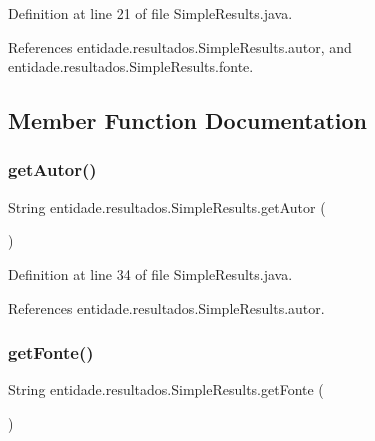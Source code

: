 Definition at line 21 of file Simple\+Results.\+java.



References entidade.\+resultados.\+Simple\+Results.\+autor, and entidade.\+resultados.\+Simple\+Results.\+fonte.



\subsection{Member Function Documentation}
\hypertarget{classentidade_1_1resultados_1_1SimpleResults_a9d78a2cab567ec7193d5a0defdd8629c}{}\label{classentidade_1_1resultados_1_1SimpleResults_a9d78a2cab567ec7193d5a0defdd8629c} 
\subsubsection{\texorpdfstring{get\+Autor()}{getAutor()}}
{\footnotesize\ttfamily String entidade.\+resultados.\+Simple\+Results.\+get\+Autor (\begin{DoxyParamCaption}{ }\end{DoxyParamCaption})}



Definition at line 34 of file Simple\+Results.\+java.



References entidade.\+resultados.\+Simple\+Results.\+autor.

\hypertarget{classentidade_1_1resultados_1_1SimpleResults_af74e679c1d8154f9c4fc247edda6abed}{}\label{classentidade_1_1resultados_1_1SimpleResults_af74e679c1d8154f9c4fc247edda6abed} 
\subsubsection{\texorpdfstring{get\+Fonte()}{getFonte()}}
{\footnotesize\ttfamily String entidade.\+resultados.\+Simple\+Results.\+get\+Fonte (\begin{DoxyParamCaption}{ }\end{DoxyParamCaption})}



